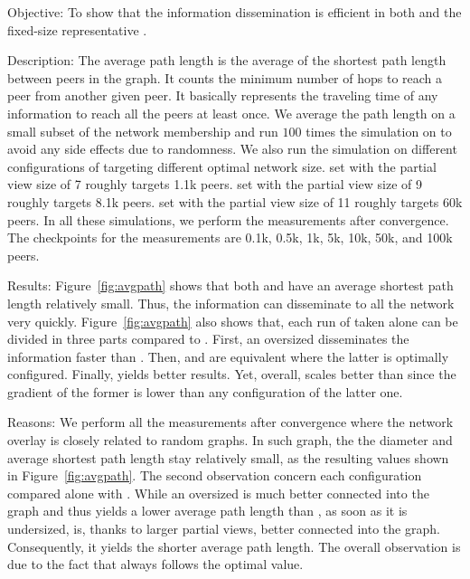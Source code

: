 \begin{asparadesc}
\item[Objective:] To show that the information dissemination is efficient in
  both \SPRAY and the fixed-size representative \CYCLON. 
\item[Description:] The average path length is the average of the shortest path
  length between peers in the graph. It counts the minimum number of hops to
  reach a peer from another given peer. It basically represents the traveling
  time of any information to reach all the peers at least once. We average the
  path length on a small subset of the network membership and run $100$ times
  the simulation on \SPRAY to avoid any side effects due to randomness. We also
  run the simulation on different configurations of \CYCLON targeting different
  optimal network size. \CYCLON set with the partial view size of 7 roughly
  targets 1.1k peers. \CYCLON set with the partial view size of 9 roughly
  targets 8.1k peers. \CYCLON set with the partial view size of 11 roughly
  targets 60k peers. In all these simulations, we perform the measurements
  after convergence. The checkpoints for the measurements are 0.1k, 0.5k, 1k,
  5k, 10k, 50k, and 100k peers.
\item[Results:] Figure~\ref{fig:avgpath} shows that both \CYCLON and \SPRAY
  have an average shortest path length relatively small. Thus, the information
  can disseminate to all the network very quickly. Figure~\ref{fig:avgpath}
  also shows that, each run of \CYCLON taken alone can be divided in three
  parts compared to \SPRAY. First, an oversized \CYCLON disseminates the
  information faster than \SPRAY. Then, \SPRAY and \CYCLON are equivalent
  where the latter is optimally configured. Finally, \SPRAY yields better
  results. Yet, overall, \SPRAY scales better than \CYCLON since the
  gradient of the former is lower than any configuration of the latter one.
\item[Reasons:] We perform all the measurements after convergence where the
  network overlay is closely related to random graphs. In such graph, the the
  diameter and average shortest path length stay relatively small, as the
  resulting values shown in Figure~\ref{fig:avgpath}. The second observation
  concern each \CYCLON configuration compared alone with \SPRAY. While an
  oversized \CYCLON is much better connected into the graph and thus yields a
  lower average path length than \SPRAY, as soon as it is undersized,
  \SPRAY is, thanks to larger partial views, better connected into the graph.
  Consequently, it yields the shorter average path length. The overall
  observation is due to the fact that \SPRAY always follows the optimal
  value.
\end{asparadesc}

